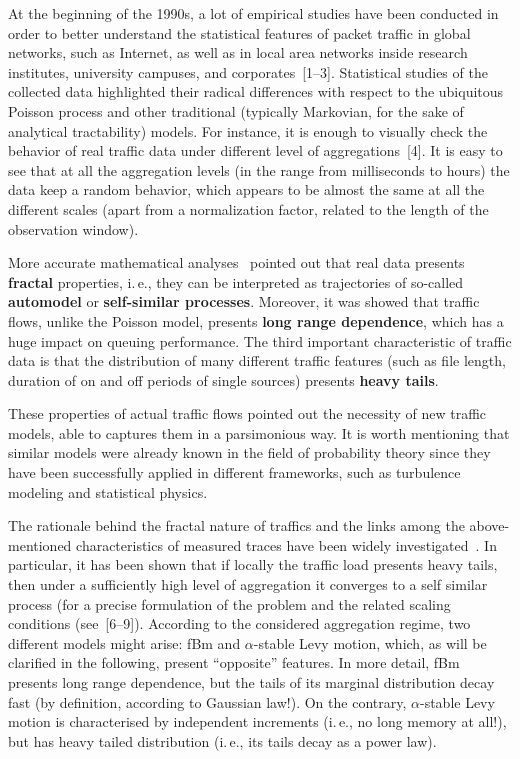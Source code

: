 \begin{multicols}{2}
At the beginning of the 1990s, a lot of empirical studies have been conducted in 
order to better understand the statistical features of packet traffic in global 
networks, such as Internet, as well as in local area networks inside research institutes, university campuses, 
and corporates~[1--3]. Statistical studies of the collected data highlighted their radical 
differences with respect to the ubiquitous Poisson process and other traditional (typically 
Markovian, for the sake of analytical tractability) models.  For instance, it is enough to visually 
check the behavior of real traffic data under different level of aggregations~[4]. 
It is easy to see that at all the aggregation levels (in the range from milliseconds to hours) 
the data keep a random behavior, which appears to be almost the same 
at all the different scales (apart from a normalization factor, related to the length of the 
observation window).

More accurate mathematical analyses~\cite{1-nik} 
pointed out that real data presents {\bf fractal} properties, i.\,e., they can be interpreted as 
trajectories of so-called {\bf automodel} or {\bf self-similar processes}.
Moreover, it was showed that traffic flows, unlike the Poisson model, presents 
{\bf long range dependence}, which has a huge impact on queuing performance.
The third important characteristic of traffic data is that the distribution of many different 
traffic features (such as file length, duration of on and off periods of single sources) presents 
{\bf heavy tails}. 

These  properties of actual traffic flows pointed out the necessity of new traffic models, able to 
captures them in a parsimonious way. It is worth mentioning that similar models were already known 
in the field of probability theory since they have been successfully applied in different frameworks, 
such as turbulence modeling and statistical physics.  

The rationale behind the fractal nature of traffics and the links among the above-mentioned 
characteristics of measured traces have been widely investigated~\cite{5-nik}. 
In particular, it has been 
shown that if locally the traffic load presents heavy tails, then under a sufficiently high level 
of aggregation it converges to a self similar process (for a precise formulation of the problem and 
the related scaling conditions (see~[6--9]). According to the considered aggregation 
regime, two 
different models might arise: fBm and $\alpha$-stable Levy motion, 
which, as will be clarified in the following, present ``opposite'' features.  
In more detail, fBm presents long range dependence, but the tails of its marginal distribution decay 
fast (by definition, according to Gaussian law!). On the contrary,  $\alpha$-stable Levy motion is 
characterised by independent increments (i.\,e., no long memory at all!), but has heavy tailed 
distribution (i.\,e., its tails decay as a power law). 


\end{multicols}
